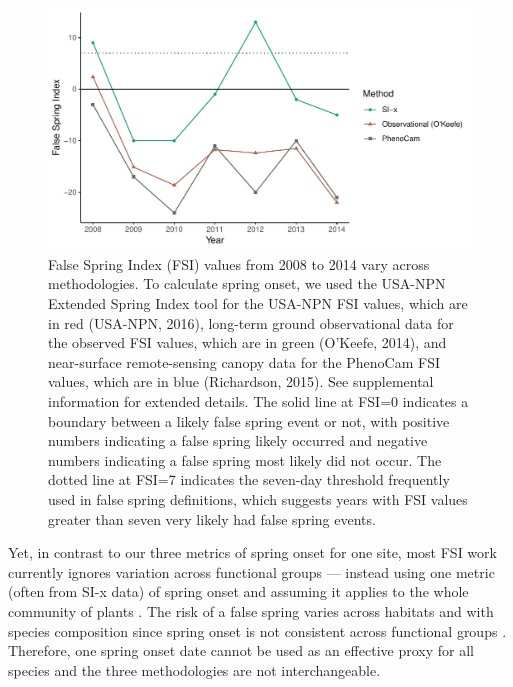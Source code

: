 \documentclass{article}\usepackage[]{graphicx}\usepackage[]{color}
\makeatletter
\def\maxwidth{ %
  \ifdim\Gin@nat@width>\linewidth
    \linewidth
  \else
    \Gin@nat@width
  \fi
}
\makeatother
\begin{document}
\begin{figure}[H]

{\centering \includegraphics[width=\maxwidth]{figure/fsifig-1} 

}

\caption[False Spring Index (FSI) values from 2008 to 2014 vary across methodologies]{False Spring Index (FSI) values from 2008 to 2014 vary across methodologies. To calculate spring onset, we used the USA-NPN Extended Spring Index tool for the USA-NPN FSI values, which are in red (USA-NPN, 2016), long-term ground observational data for the observed FSI values, which are in green (O'Keefe, 2014), and near-surface remote-sensing canopy data for the PhenoCam FSI values, which are in blue (Richardson, 2015). See supplemental information for extended details. The solid line at FSI=0 indicates a boundary between a likely false spring event or not, with positive numbers indicating a false spring likely occurred and negative numbers indicating a false spring most likely did not occur. The dotted line at FSI=7 indicates the seven-day threshold frequently used in false spring definitions, which suggests years with FSI values greater than seven very likely had false spring events.}\label{fig:fsifig}
\end{figure}




Yet, in contrast to our three metrics of spring onset for one site, most FSI work currently ignores variation across functional groups --- instead using one metric (often from SI-x data) of spring onset and assuming it applies to the whole community of plants \citep{Allstadt2015, Marino2011, Mehdipoor2017, Peterson2014}. The risk of a false spring varies across habitats and with species composition since spring onset is not consistent across functional groups \citep{Martin2010}. Therefore, one spring onset date cannot be used as an effective proxy for all species and the three methodologies are not interchangeable. 
\end{document}
